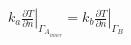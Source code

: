 \begin{gather*}
\left.k_a\frac{\partial T}{\partial n}\right|_{\Gamma_{A_{inner}}} = \left.k_b\frac{\partial T}{\partial n}\right|_{\Gamma_B}
\end{gather*}

%

